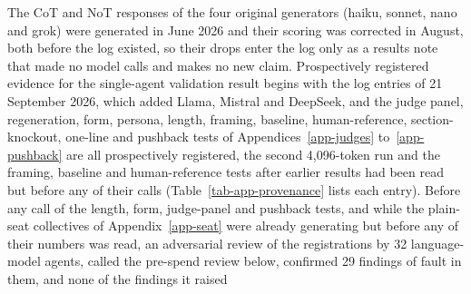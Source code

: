 The CoT and NoT responses of the four original generators (haiku, sonnet,
nano and grok) were generated in June 2026 and their scoring was corrected
in August, both before the log existed, so their drops enter the log only
as a results note that made no model calls and makes no new claim.
Prospectively registered evidence for the single-agent validation result
begins with the log entries of 21 September 2026, which added Llama, Mistral
and DeepSeek, and the judge panel, regeneration, form, persona, length,
framing, baseline, human-reference, section-knockout, one-line and pushback
tests of Appendices~\ref{app-judges} to~\ref{app-pushback} are all
prospectively registered, the second 4,096-token run and the framing,
baseline and human-reference tests after earlier results had been read but
before any of their calls (Table~\ref{tab-app-provenance} lists each entry).
Before any call of the length, form, judge-panel and pushback tests, and while
the plain-seat collectives of Appendix~\ref{app-seat} were already generating
but before any of their numbers was read, an adversarial review of the
registrations by 32 language-model agents, called the pre-spend review below,
confirmed 29 findings of fault in them, and none of the findings it raised
